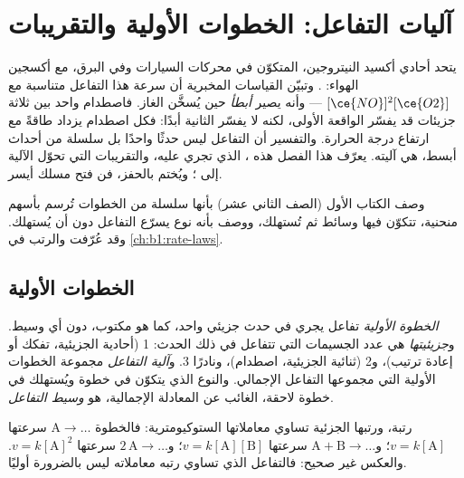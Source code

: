 \chapter{آليات التفاعل: الخطوات الأولية والتقريبات}\label{ch:b1:elementary-steps}

يتحد أحادي أكسيد النيتروجين، المتكوّن في محركات السيارات وفي البرق، مع
أكسجين الهواء: . وتبيّن القياسات المخبرية أن
سرعة هذا التفاعل متناسبة مع $[\ce{NO}]^2[\ce{O2}]$ --- وأنه
يصير \emph{أبطأ} حين يُسخَّن الغاز. فاصطدام واحد بين ثلاثة
جزيئات قد يفسّر الواقعة الأولى، لكنه لا يفسّر الثانية أبدًا: فكل
اصطدام يزداد طاقةً مع ارتفاع درجة الحرارة. والتفسير أن
التفاعل ليس حدثًا واحدًا بل سلسلة من أحداث أبسط، هي
آليته. يعرّف هذا الفصل هذه ،  الذي تجري عليه، والتقريبات التي تحوّل
الآلية إلى ؛ ويُختم بالحفز، فن فتح
مسلك أيسر.

\begin{recall}
وصف الكتاب الأول (الصف الثاني عشر)  بأنها سلسلة من الخطوات
تُرسم بأسهم منحنية، تتكوّن فيها وسائط ثم تُستهلك، ووصف
 بأنه نوع يسرّع التفاعل دون أن يُستهلك.
وقد عُرّفت  والرتب  في
\cref{ch:b1:rate-laws}.
\end{recall}

\section{الخطوات الأولية}

\begin{definition}\label{def:b1:elementary-steps:elementary-step}
\emph{الخطوة الأولية} تفاعل يجري
في حدث جزيئي واحد، كما هو مكتوب، دون أي
وسيط. و\emph{جزيئيتها} هي عدد
الجسيمات التي تتفاعل في ذلك الحدث: 1 (أحادية الجزيئية، تفكك أو
إعادة ترتيب)، و2 (ثنائية الجزيئية، اصطدام)، ونادرًا 3. و\emph{آلية
التفاعل} مجموعة الخطوات الأولية التي
مجموعها التفاعل الإجمالي. والنوع الذي يتكوّن في خطوة ويُستهلك في
خطوة لاحقة، الغائب عن المعادلة الإجمالية، هو \emph{وسيط
التفاعل}.
\end{definition}

\begin{proposition}\label{prop:b1:elementary-steps:elementary-law}
 رتبة، ورتبها الجزئية تساوي
معاملاتها الستوكيومترية: فالخطوة $\mathrm{A} \to \dots$ سرعتها $v = k[\mathrm{A}]$؛
و$\mathrm{A} + \mathrm{B} \to \dots$ سرعتها $v = k[\mathrm{A}][\mathrm{B}]$؛
و$2\,\mathrm{A} \to \dots$ سرعتها $v = k[\mathrm{A}]^2$. والعكس غير صحيح:
فالتفاعل الذي تساوي رتبه معاملاته ليس بالضرورة أوليًا.
\end{proposition}

